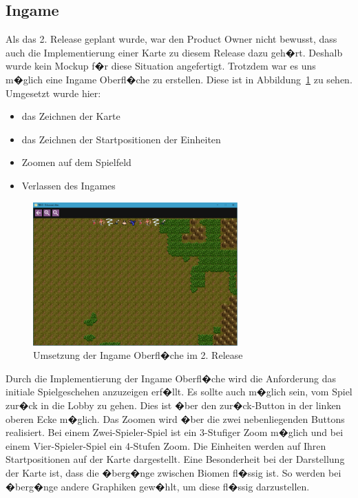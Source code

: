 \documentclass[12pt, titlepage]{scrartcl}
\newcommand{\Abb}[1]{%
	Abbildung\ \ref{#1}%
}
\begin{document}
			\subsection{Ingame}
			Als das 2. Release geplant wurde, war den Product Owner nicht bewusst, dass auch die Implementierung einer Karte zu diesem Release dazu geh�rt. Deshalb wurde kein Mockup f�r diese Situation angefertigt. Trotzdem war es uns m�glich eine Ingame Oberfl�che zu erstellen. Diese ist in \Abb{Ingame} zu sehen. Umgesetzt wurde hier:
			\begin{itemize}
				\item das Zeichnen der Karte
				\item das Zeichnen der Startpositionen der Einheiten
				\item Zoomen auf dem Spielfeld
				\item Verlassen des Ingames
			\end{itemize}
			\begin{figure}[H] 
				\centering
				\includegraphics[width=0.7\textwidth]{Ingame_final.PNG}
				\caption{Umsetzung der Ingame Oberfl�che im 2. Release}
				\label{Ingame}
			\end{figure}
			Durch die Implementierung der Ingame Oberfl�che wird die Anforderung das initiale Spielgeschehen anzuzeigen erf�llt. Es sollte auch m�glich sein, vom Spiel zur�ck in die Lobby zu gehen. Dies ist �ber den zur�ck-Button in der linken oberen Ecke m�glich. Das Zoomen wird �ber die zwei nebenliegenden Buttons realisiert. Bei einem Zwei-Spieler-Spiel ist ein 3-Stufiger Zoom m�glich und bei einem Vier-Spieler-Spiel ein 4-Stufen Zoom. Die Einheiten werden auf Ihren Startpositionen auf der Karte dargestellt. Eine Besonderheit bei der Darstellung der Karte ist, dass die �berg�nge zwischen Biomen fl�ssig ist. So werden bei �berg�nge andere Graphiken gew�hlt, um diese fl�ssig darzustellen.
			
\end{document}
